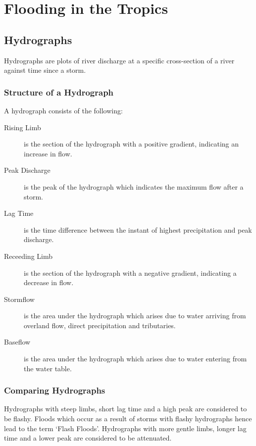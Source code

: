 \documentclass[../../main]{subfiles}
\begin{document}
\section{Flooding in the Tropics}

\subsection{Hydrographs}

	Hydrographs are plots of river discharge at a specific cross-section of a river against time since a storm. 

\subsubsection{Structure of a Hydrograph}

	A hydrograph consists of the following:

	\begin{description}
		\item[Rising Limb] is the section of the hydrograph with a positive gradient, indicating an increase in flow.
		\item[Peak Discharge] is the peak of the hydrograph which indicates the maximum flow after a storm.
		\item[Lag Time] is the time difference between the instant of highest precipitation and peak discharge.
		\item[Receeding Limb] is the section of the hydrograph with a negative gradient, indicating a decrease in flow.
		\item[Stormflow] is the area under the hydrograph which arises due to water arriving from overland flow, direct precipitation and tributaries.
		\item[Baseflow] is the area under the hydrograph which arises due to water entering from the water table.
	\end{description}

\subsubsection{Comparing Hydrographs}

	Hydrographs with steep limbs, short lag time and a high peak are considered to be flashy. Floods which occur as a result of storms with flashy hydrographs hence lead to the term `Flash Floods'. Hydrographs with more gentle limbs, longer lag time and a lower peak are considered to be attenuated.
\end{document}
